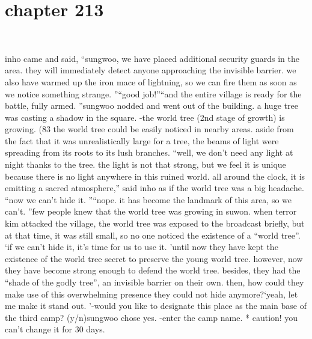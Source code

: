 \section{chapter 213}

                             




inho came and said, “sungwoo, we have placed additional security guards in the area.
 they will immediately detect anyone approaching the invisible barrier.
 we also have warmed up the iron mace of lightning, so we can fire them as soon as we notice something strange.
”“good job!”“and the entire village is ready for the battle, fully armed.
”sungwoo nodded and went out of the building.
a huge tree was casting a shadow in the square.
-the world tree (2nd stage of growth) is growing.
 (83%
 the world tree could be easily noticed in nearby areas.
aside from the fact that it was unrealistically large for a tree, the beams of light were spreading from its roots to its lush branches.
“well, we don’t need any light at night thanks to the tree.
 the light is not that strong, but we feel it is unique because there is no light anywhere in this ruined world.
 all around the clock, it is emitting a sacred atmosphere,” said inho as if the world tree was a big headache.
“now we can’t hide it.
”“nope.
 it has become the landmark of this area, so we can’t.
”few people knew that the world tree was growing in suwon.
when terror kim attacked the village, the world tree was exposed to the broadcast briefly, but at that time, it was still small, so no one noticed the existence of a “world tree”.
‘if we can’t hide it, it’s time for us to use it.
’until now they have kept the existence of the world tree secret to preserve the young world tree.
however, now they have become strong enough to defend the world tree.
 besides, they had the “shade of the godly tree”, an invisible barrier on their own.
then, how could they make use of this overwhelming presence they could not hide anymore?‘yeah, let me make it stand out.
’-would you like to designate this place as the main base of the third camp? (y/n)sungwoo chose yes.
-enter the camp name.
* caution! you can’t change it for 30 days.

